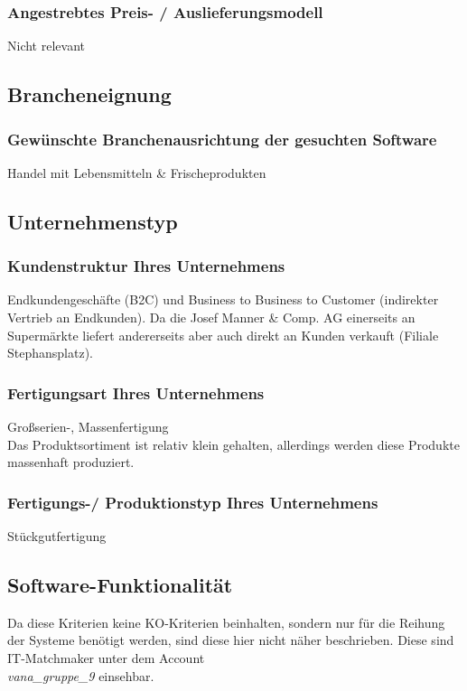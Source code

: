 \subsubsection{Angestrebtes Preis- / Auslieferungsmodell}
Nicht relevant
\newpage
\subsection{Brancheneignung}
\subsubsection{Gewünschte Branchenausrichtung der gesuchten Software}
Handel mit Lebensmitteln \& Frischeprodukten

\subsection{Unternehmenstyp}
\subsubsection{Kundenstruktur Ihres Unternehmens}
Endkundengeschäfte (B2C) und Business to Business to Customer (indirekter Vertrieb an Endkunden). Da die Josef Manner \& Comp. AG einerseits an Supermärkte liefert andererseits aber auch direkt an Kunden verkauft (Filiale Stephansplatz).
\subsubsection{Fertigungsart Ihres Unternehmens}
Großserien-, Massenfertigung\\
Das Produktsortiment ist relativ klein gehalten, allerdings werden diese Produkte massenhaft produziert.

\subsubsection{Fertigungs-/ Produktionstyp Ihres Unternehmens}
Stückgutfertigung

\subsection{Software-Funktionalität}
Da diese Kriterien keine KO-Kriterien beinhalten, sondern nur für die Reihung der Systeme benötigt werden, sind diese hier nicht näher beschrieben. Diese sind IT-Matchmaker unter dem Account \\ \textit{vana\_gruppe\_9} einsehbar.

